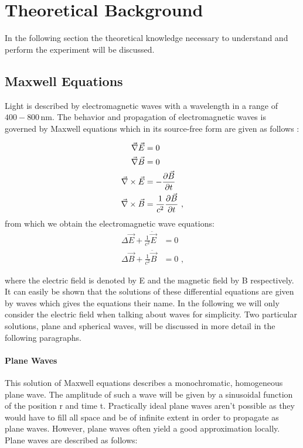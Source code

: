 \section{Theoretical Background}

In the following section the theoretical knowledge necessary to understand and perform the experiment will be discussed.

\subsection{Maxwell Equations}

Light is described by electromagnetic waves with a wavelength in a range of $400-800\,\mathrm{nm}$. The behavior and propagation of electromagnetic waves is governed by Maxwell equations which in its source-free form are given as follows \cite{demtroeder2}:

\begin{align}
	\nab \vec{E}&=0\\
	\nab \vec{B}&=0\\
	\nab\times\vec{E}&=-\del[\vec B]{t}\\
	\nab\times\vec{B}&=\frac1{c^2}\del[\vec B]{t}\text{ ,}
\end{align}
from which we obtain the electromagnetic wave equations:
\begin{align}
	\Delta \vec{E} + \frac{1}{c^2} \ddot{\vec{E}}&= 0\\
	\Delta \vec{B} + \frac{1}{c^2} \ddot{\vec{B}}&= 0\text{ ,}
\end{align}

where the electric field is denoted by E and the magnetic field by B respectively. It can easily be shown that the solutions of these differential equations are given by waves which gives the equations their name. In the following we will only consider the electric field when talking about waves for simplicity. Two particular solutions, plane and spherical waves, will be discussed in more detail in the following paragraphs.
\paragraph{Plane Waves}

This solution of Maxwell equations describes a monochromatic, homogeneous plane wave. The amplitude of such a wave will be given by a sinusoidal function of the position r and time t. Practically ideal plane waves aren't possible as they would have to fill all space and be of infinite extent in order to propagate as plane waves. However, plane waves often yield a good approximation locally. Plane waves are described as follows:

